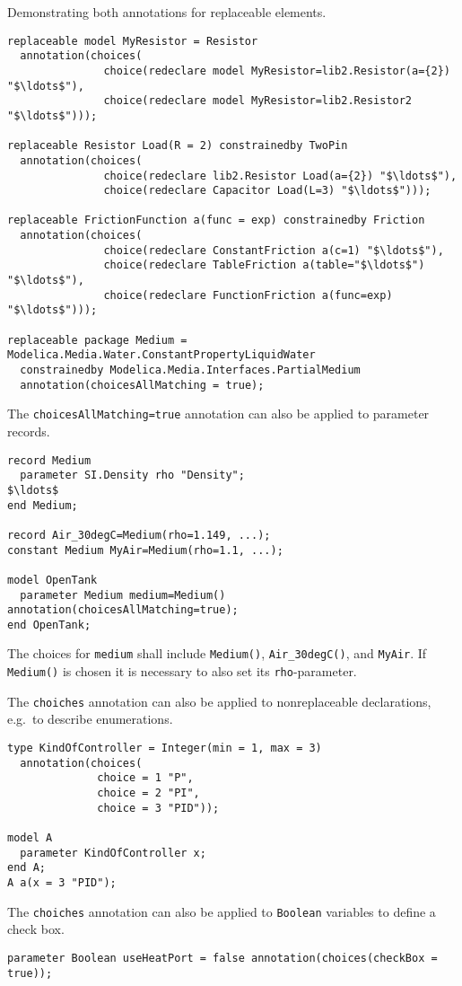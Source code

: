 \begin{example}
Demonstrating both annotations for replaceable elements.
\begin{lstlisting}[language=modelica]
replaceable model MyResistor = Resistor
  annotation(choices(
               choice(redeclare model MyResistor=lib2.Resistor(a={2}) "$\ldots$"),
               choice(redeclare model MyResistor=lib2.Resistor2 "$\ldots$")));

replaceable Resistor Load(R = 2) constrainedby TwoPin
  annotation(choices(
               choice(redeclare lib2.Resistor Load(a={2}) "$\ldots$"),
               choice(redeclare Capacitor Load(L=3) "$\ldots$")));

replaceable FrictionFunction a(func = exp) constrainedby Friction
  annotation(choices(
               choice(redeclare ConstantFriction a(c=1) "$\ldots$"),
               choice(redeclare TableFriction a(table="$\ldots$") "$\ldots$"),
               choice(redeclare FunctionFriction a(func=exp) "$\ldots$")));

replaceable package Medium = Modelica.Media.Water.ConstantPropertyLiquidWater
  constrainedby Modelica.Media.Interfaces.PartialMedium
  annotation(choicesAllMatching = true);
\end{lstlisting}

The \lstinline!choicesAllMatching=true! annotation can also be applied to parameter records.
\begin{lstlisting}[language=modelica]
record Medium
  parameter SI.Density rho "Density";
$\ldots$
end Medium;

record Air_30degC=Medium(rho=1.149, ...);
constant Medium MyAir=Medium(rho=1.1, ...);

model OpenTank
  parameter Medium medium=Medium() annotation(choicesAllMatching=true);
end OpenTank;
\end{lstlisting}
The choices for \lstinline!medium! shall include \lstinline!Medium()!, \lstinline!Air_30degC()!, and \lstinline!MyAir!.
If \lstinline!Medium()! is chosen it is necessary to also set its \lstinline!rho!-parameter.

The \lstinline!choiches! annotation can also be applied to nonreplaceable declarations, e.g.\ to describe enumerations.
\begin{lstlisting}[language=modelica]
type KindOfController = Integer(min = 1, max = 3)
  annotation(choices(
              choice = 1 "P",
              choice = 2 "PI",
              choice = 3 "PID"));

model A
  parameter KindOfController x;
end A;
A a(x = 3 "PID");
\end{lstlisting}

The \lstinline!choiches! annotation can also be applied to \lstinline!Boolean! variables to define a check box.
\begin{lstlisting}[language=modelica]
parameter Boolean useHeatPort = false annotation(choices(checkBox = true));
\end{lstlisting}
\end{example}
